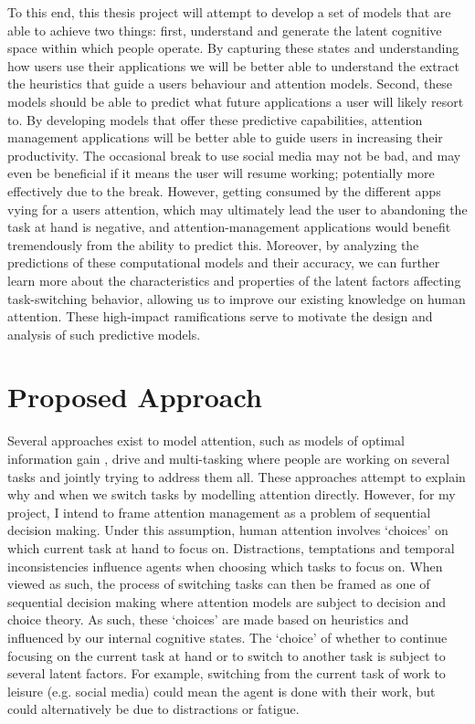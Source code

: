  To this end, this thesis project will attempt to develop a set of models that are able to achieve two things: first, understand and generate the latent cognitive space within which people operate. By capturing these states and understanding how users use their applications we will be better able to understand the extract the heuristics that guide a users behaviour and attention models. Second, these models should be able to predict what future applications a user will likely resort to. By developing models that offer these predictive capabilities, attention management applications will be better able to guide users in increasing their productivity. The occasional break to use social media may not be bad, and may even be beneficial if it means the user will resume working; potentially more effectively due to the break. However, getting consumed by the different apps vying for a users attention, which may ultimately lead the user to abandoning the task at hand is negative, and attention-management applications would benefit tremendously from the ability to predict this. Moreover, by analyzing the predictions of these computational models and their accuracy, we can further learn more about the characteristics and properties of the latent factors affecting task-switching behavior, allowing us to improve our existing knowledge on human attention. These high-impact ramifications serve to motivate the design and analysis of such predictive models.\\

 \section{Proposed Approach}

 Several approaches exist to model attention, such as models of optimal information gain \citep{pirolli1999information}, drive and multi-tasking where people are working on several tasks and jointly trying to address them all. These approaches attempt to explain why and when we switch tasks by modelling attention directly. However, for my project, I intend to frame attention management as a problem of sequential decision making. Under this assumption, human attention involves `choices' on which current task at hand to focus on. Distractions, temptations and temporal inconsistencies influence agents when choosing which tasks to focus on. When viewed as such, the process of switching tasks can then be framed as one of sequential decision making where attention models are subject to decision and choice theory. As such, these `choices' are made based on heuristics and influenced by our internal cognitive states. The `choice' of whether to continue focusing on the current task at hand or to switch to another task is subject to several latent factors. For example, switching from the current task of work to leisure (e.g. social media) could mean the agent is done with their work, but could alternatively be due to distractions or fatigue.\\

